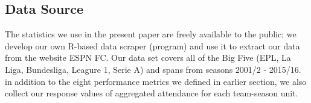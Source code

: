 \documentclass[inte,blindrev]{informs3}
\begin{document}
\subsection*{Data Source}
The statistics we use in the present paper are freely available to the public; we develop our own R-based data scraper (program) and use it to extract our data from the website ESPN FC. Our data set covers all of the Big Five (EPL, La Liga, Bundesliga, Leagure 1, Serie A) and spans from seasons 2001/2 - 2015/16. in addition to the eight performance metrics we defined in earlier section, we also collect our response values of aggregated attendance for each team-season unit.   


\end{document}
